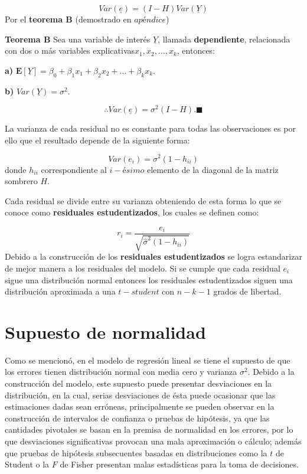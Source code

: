 \documentclass[
  a4paper,
  oneside,
  openany]{book}
\begin{document}
\[Var(\underline{e})=(I-H)Var(\underline{Y})\]
Por el \textbf{teorema B} (demostrado en \(apéndice\))

\textbf{Teorema B} Sea una variable de interés \(\underline{Y}\), llamada \textbf{dependiente}, relacionada con dos o más variables explicativas\(x_{1},x_{2},\ldots,x_{k}\),
entonces:

\textbf{a)} \(\mathbf{E}[\underline{Y}]= \beta_{0}+\beta_{1}x_{1}+\beta_{2}x_{2}+ \ldots + \beta_{k}x_{k}.\)

\textbf{b)} \(Var(\underline{Y})= \sigma^2.\)

\[\therefore Var(\underline{e})=\sigma^2(I-H). \blacksquare\]

La varianza de cada residual no es constante para todas las observaciones es por ello que el resultado depende de la siguiente forma:

\[Var(e_{i})=\sigma^2(1-h_{ii})\]
donde \(h_{ii}\) correspondiente al \(i-ésimo\) elemento de la diagonal de la matriz sombrero \(H\).

Cada residual se divide entre su varianza obteniendo de esta forma lo que se conoce como \textbf{residuales estudentizados}, los cuales se definen como:

\[r_{i}=\frac{e_{i}}{\sqrt{\hat{\sigma}^2(1-h_{ii})}}\]
Debido a la construcción de los \textbf{residuales estudentizados} se logra estandarizar de mejor manera a los residuales del modelo. Si se cumple que cada residual \(e_{i}\) sigue una distribución normal entonces los residuales estudentizados siguen una distribución aproximada a una \(t-student\) con \(n-k-1\) grados de libertad.

\hypertarget{supuesto-de-normalidad}{%
\section{Supuesto de normalidad}\label{supuesto-de-normalidad}}

Como se mencionó, en el modelo de regresión lineal se tiene el supuesto de que los errores tienen distribución normal con media cero y varianza \(\sigma^2\). Debido a la construcción del modelo, este supuesto puede presentar desviaciones en la distribución, en la cual, serias desviaciones de ésta puede ocasionar que las estimaciones dadas sean erróneas, principalmente se pueden observar en la construcción de intervalos de confianza o pruebas de hipótesis, ya que las cantidades pivotales se basan en la premisa de normalidad en los errores, por lo que desviaciones significativas provocan una mala aproximación o cálculo; además que pruebas de hipótesis subsecuentes basadas en distribuciones como la \(t\) de Student o la \(F\) de Fisher presentan malas estadísticas para la toma de decisiones.
\end{document}
